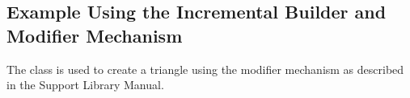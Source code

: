 

\subsection{Example Using the Incremental Builder and Modifier Mechanism}

The  class is used to create
a triangle using the modifier mechanism as described in the Support
Library Manual.



